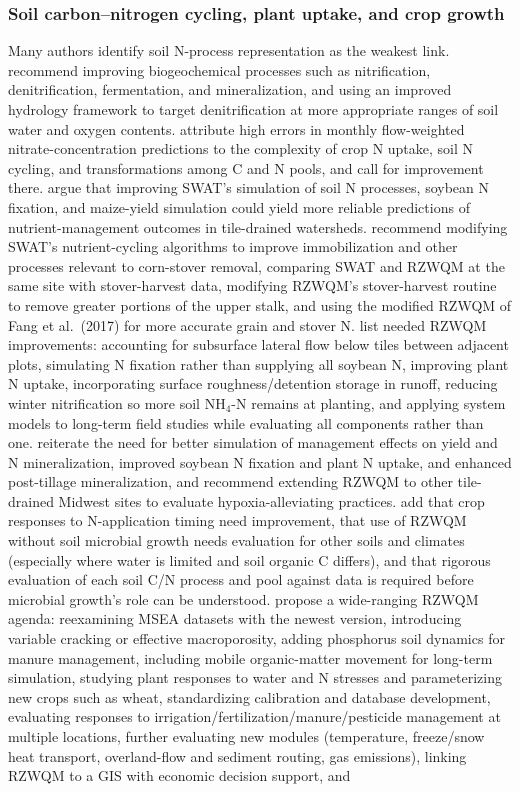\subsubsection{Soil carbon--nitrogen cycling, plant uptake, and crop growth}
Many authors identify soil N-process representation as the weakest link. \textcite{Smith2020} recommend improving biogeochemical processes such as nitrification, denitrification, fermentation, and mineralization, and using an improved hydrology framework to target denitrification at more appropriate ranges of soil water and oxygen contents. \textcite{Fang2012} attribute high errors in monthly flow-weighted nitrate-concentration predictions to the complexity of crop N uptake, soil N cycling, and transformations among C and N pools, and call for improvement there. \textcite{Hu2007} argue that improving SWAT's simulation of soil N processes, soybean N fixation, and maize-yield simulation could yield more reliable predictions of nutrient-management outcomes in tile-drained watersheds. \textcite{Malone2019} recommend modifying SWAT's nutrient-cycling algorithms to improve immobilization and other processes relevant to corn-stover removal, comparing SWAT and RZWQM at the same site with stover-harvest data, modifying RZWQM's stover-harvest routine to remove greater portions of the upper stalk, and using the modified RZWQM of Fang et al.\ (2017) for more accurate grain and stover N. \textcite{Ma2007} list needed RZWQM improvements: accounting for subsurface lateral flow below tiles between adjacent plots, simulating N fixation rather than supplying all soybean N, improving plant N uptake, incorporating surface roughness/detention storage in runoff, reducing winter nitrification so more soil NH$_4$-N remains at planting, and applying system models to long-term field studies while evaluating all components rather than one. \textcite{Ma2007b} reiterate the need for better simulation of management effects on yield and N mineralization, improved soybean N fixation and plant N uptake, and enhanced post-tillage mineralization, and recommend extending RZWQM to other tile-drained Midwest sites to evaluate hypoxia-alleviating practices. \textcite{Ma2008} add that crop responses to N-application timing need improvement, that use of RZWQM without soil microbial growth needs evaluation for other soils and climates (especially where water is limited and soil organic C differs), and that rigorous evaluation of each soil C/N process and pool against data is required before microbial growth's role can be understood. \textcite{Ma2001} propose a wide-ranging RZWQM agenda: reexamining MSEA datasets with the newest version, introducing variable cracking or effective macroporosity, adding phosphorus soil dynamics for manure management, including mobile organic-matter movement for long-term simulation, studying plant responses to water and N stresses and parameterizing new crops such as wheat, standardizing calibration and database development, evaluating responses to irrigation/fertilization/manure/pesticide management at multiple locations, further evaluating new modules (temperature, freeze/snow heat transport, overland-flow and sediment routing, gas emissions), linking RZWQM to a GIS with economic decision support, and 